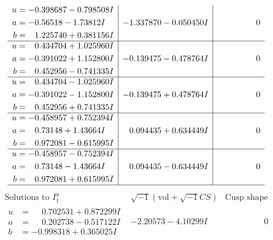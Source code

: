 \documentclass[1p]{elsarticle_modified}
\theoremstyle{definition}
\newcommand{\I}{\sqrt{-1}}
\begin{document}
$$\begin{array}{c|c|c}
\begin{aligned}
u &= -0.398687 - 0.798508 I \\
a &= -0.56518 - 1.73812 I \\
b &= \phantom{-}1.225740 + 0.381156 I\end{aligned}
 & -1.337870 - 0.050450 I & \phantom{-0.000000 } 0 \\ \hline\begin{aligned}
u &= \phantom{-}0.434704 + 1.025960 I \\
a &= -0.391022 + 1.152800 I \\
b &= \phantom{-}0.452956 - 0.741335 I\end{aligned}
 & -0.139475 - 0.478764 I & \phantom{-0.000000 } 0 \\ \hline\begin{aligned}
u &= \phantom{-}0.434704 - 1.025960 I \\
a &= -0.391022 - 1.152800 I \\
b &= \phantom{-}0.452956 + 0.741335 I\end{aligned}
 & -0.139475 + 0.478764 I & \phantom{-0.000000 } 0 \\ \hline\begin{aligned}
u &= -0.458957 + 0.752394 I \\
a &= \phantom{-}0.73148 + 1.43664 I \\
b &= \phantom{-}0.972081 - 0.615995 I\end{aligned}
 & \phantom{-}0.094435 + 0.634449 I & \phantom{-0.000000 } 0 \\ \hline\begin{aligned}
u &= -0.458957 - 0.752394 I \\
a &= \phantom{-}0.73148 - 1.43664 I \\
b &= \phantom{-}0.972081 + 0.615995 I\end{aligned}
 & \phantom{-}0.094435 - 0.634449 I & \phantom{-0.000000 } 0\\
 \hline 
 \end{array}$$\newpage$$\begin{array}{c|c|c}  
\text{Solutions to }I^u_{1}& \I (\text{vol} + \sqrt{-1}CS) & \text{Cusp shape}\\
 \hline 
\begin{aligned}
u &= \phantom{-}0.702531 + 0.872299 I \\
a &= \phantom{-}0.202738 - 0.517122 I \\
b &= -0.998318 + 0.365025 I\end{aligned}
 & -2.20573 - 4.10299 I & \phantom{-0.000000 } 0 \\ \hline\begin{aligned}

\end{aligned}
\end{array}$$
\end{document}
